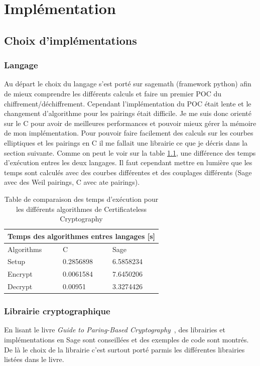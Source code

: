 \chapter{Implémentation}
\label{ch:impl}

\section{Choix d'implémentations}
\subsection{Langage}
Au départ le choix du langage s'est porté sur sagemath (framework python) afin de mieux comprendre les différents calculs et faire un premier POC du chiffrement/déchiffrement.
Cependant l'implémentation du POC était lente et le changement d'algorithme pour les pairings était difficile.
Je me suis donc orienté sur le C pour avoir de meilleures performances et pouvoir mieux gérer la mémoire de mon implémentation. Pour pouvoir faire facilement des calculs sur les courbes elliptiques et les pairings en C il me fallait une librairie ce que je décris dans la section suivante. Comme on peut le voir sur la table \ref{table:comparisonTimeAlgo}, une différence des temps d'exécution entres les deux langages. Il faut cependant mettre en lumière que les temps sont calculés avec des courbes différentes et des couplages différents (Sage avec des Weil pairings, C avec ate pairings).

\begin{table}[h!]
	\centering
	\begin{tabular}{ |p{3cm}||p{3cm}|p{3cm}| }
		\hline
		\multicolumn{3}{|c|}{Temps des algorithmes entres langages [s]} \\
		\hline
		Algorithms& C &Sage\\
		\hline
		Setup   & 0.2856898 & 6.5858234\\
		Encrypt & 0.0061584 & 7.6450206\\
		Decrypt & 0.00951 & 3.3274426\\
		\hline
	\end{tabular}
\caption{Table de comparaison des temps d'exécution pour les différents algorithmes de Certificateless Cryptography }
\label{table:comparisonTimeAlgo}
\end{table}

\subsection{Librairie cryptographique}
En lisant le livre \textit{Guide to Paring-Based Cryptography}~\cite{bookPairing}, des librairies et implémentations en Sage sont conseillées et des exemples de code sont montrés. De là le choix de la librairie c'est surtout porté parmis les différentes librairies listées dans le livre.

